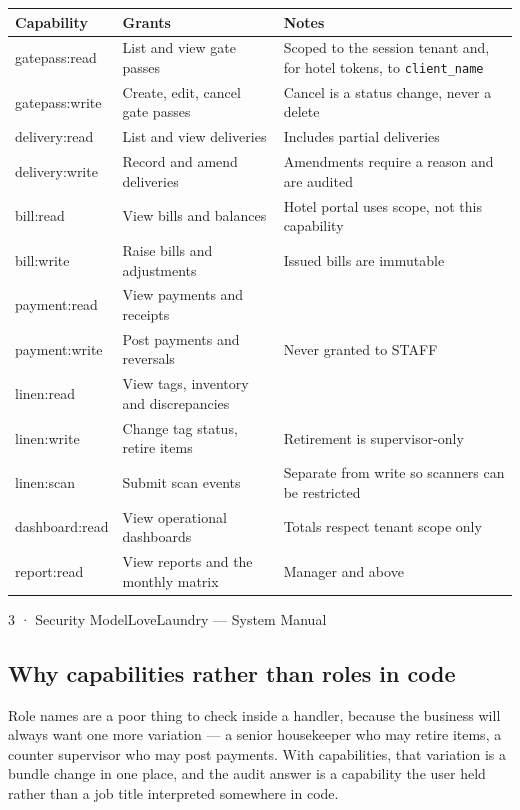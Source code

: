 \documentclass[11pt,a4paper,oneside]{book}
\begin{document}
\begin{center}\small
\begin{tabularx}{\linewidth}{|X|X|X|}
\hline
\rowcolor{lightgrey}
\textbf{Capability} & \textbf{Grants} & \textbf{Notes} \\ \hline
gatepass:read & List and view gate passes & Scoped to the session tenant and, for hotel tokens, to \texttt{client\_name} \\ \hline
gatepass:write & Create, edit, cancel gate passes & Cancel is a status change, never a delete \\ \hline
delivery:read & List and view deliveries & Includes partial deliveries \\ \hline
delivery:write & Record and amend deliveries & Amendments require a reason and are audited \\ \hline
bill:read & View bills and balances & Hotel portal uses scope, not this capability \\ \hline
bill:write & Raise bills and adjustments & Issued bills are immutable \\ \hline
payment:read & View payments and receipts &  \\ \hline
payment:write & Post payments and reversals & Never granted to STAFF \\ \hline
linen:read & View tags, inventory and discrepancies &  \\ \hline
linen:write & Change tag status, retire items & Retirement is supervisor-only \\ \hline
linen:scan & Submit scan events & Separate from write so scanners can be restricted \\ \hline
dashboard:read & View operational dashboards & Totals respect tenant scope only \\ \hline
report:read & View reports and the monthly matrix & Manager and above \\ \hline
\end{tabularx}
\end{center}
3 · Security ModelLoveLaundry — System Manual

\subsection*{Why capabilities rather than roles in code}
Role names are a poor thing to check inside a handler, because the business will always want one more variation — a senior housekeeper who may retire items, a counter supervisor who may post payments. With capabilities, that variation is a bundle change in one place, and the audit answer is a capability the user held rather than a job title interpreted somewhere in code.
\end{document}
